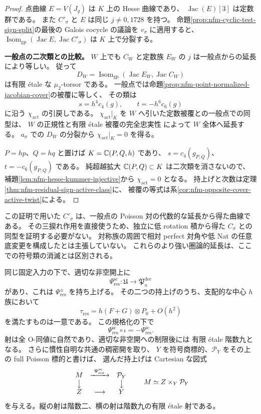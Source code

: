 \begin{proof}
点曲線 $E=V(J_g)$ は $K$ 上の Hesse 曲線であり、
$\operatorname{Jac}(E)[3]$ は定数群である。
また $C'_\sigma$ と $E$ は同じ $j\ne0,1728$ を持つ。
命題\ref{prop:nfm-cyclic-test-sign-split}の最後の Galois cocycle の議論を
$v_\sigma$ に適用すると、
$\operatorname{Isom}_{\mathrm{gp}}(\operatorname{Jac}E,\operatorname{Jac}C'_\sigma)$
は $K$ 上で分裂する。

\textbf{一般点の二次類との比較。}
$W$ 上でも $C_W$ と定数族 $E_W$ の $j$ は一般点からの延長により等しい。
従って
\[
 D_W=\operatorname{Isom}_{\mathrm{gp}}
       (\operatorname{Jac}E_W,\operatorname{Jac}C_W)
\]
は有限 \'etale な $\mu_2$-torsor である。
一般点では命題\ref{prop:nfm-point-normalized-jacobian-cover}の被覆に等しく、
その類は
\[
 s=h^4c_4(g),\qquad t=-h^6c_6(g)
\]
に沿う $\chi_{\mathrm{act}}$ の引戻しである。
$\chi_{\mathrm{act}}|_K$ を $W$ へ引いた定数被覆との一般点での同型は、
$W$ の正規性と有限 \'etale 被覆の完全忠実性
\cite[Lemma~58.10.7, Tag~0BQI]{NFMStacksEtaleNormal}によって $W$ 全体へ延長する。
$a_\sigma$ での $D_W$ の分裂から $\chi_{\mathrm{act}}|_K=0$ を得る。

$P=hp$、$Q=hq$ と置けば $K=\mathbb C(P,Q,h)$ であり、
$s=c_4(g_{P,Q})$、$t=-c_6(g_{P,Q})$ である。
純超越拡大 $\mathbb C(P,Q)\subset K$ は二次類を消さないので、
補題\ref{lem:nfm-hesse-kummer-injective}から $\chi_{\mathrm{act}}=0$ となる。
持上げと次数は定理\ref{thm:nfm-residual-sign-active-class}に、
被覆の等式は系\ref{cor:nfm-opposite-cover-active-twist}による。
\end{proof}

この証明で用いた $C'_\sigma$ は、一般点の Poisson 対の代数的な延長から得た曲線である。
その三捩れ作用を直接使うため、独立に低 rotation 積から得た
$C_\sigma$ との同型を証明する必要がない。
対称族の周囲で相対 perfect 対角や低 Nat の任意底変更を構成したとは主張していない。
これらのより強い圏論的延長は、ここでの符号類の消滅とは区別される。

\begin{corollary}
\label{cor:nfm-semiclassical-full-residual}
同じ固定入力の下で、適切な非空開上に
\[
 \Psi_{\mathrm{res}}^{\mathrm{sc}}:
     \mathfrak U\longrightarrow\mathfrak P_n^{\mathrm{dec}}
\]
があり、これは $\Psi_{\mathrm{res}}^\pm$ を持ち上げる。
その二つの持上げのうち、支配的な中心 $h$ 族において
\[
 \tau_{\mathrm{res}}
   =h(F+G)\otimes P_0+O(h^2)
\]
を満たすものは一意である。
この規格化の下で
\[
 \Psi_{\mathrm{res}}^{\mathrm{sc}}\circ\iota
     =-\Psi_{\mathrm{res}}^{\mathrm{sc}}.
\]
射は全 O-同値に自然であり、適切な非空開への制限後には
有限 \'etale 階数九となる。
さらに慣性自明な共通の稠密開を取り、
$Y$ を符号商標的、$\mathcal P_Y$ をその上の full Poisson 標的と書けば、
選んだ持上げは Cartesian な図式
\[
 \begin{array}{ccc}
 M&\xrightarrow{\ \Psi_{\mathrm{res}}^{\mathrm{sc}}\ }&\mathcal P_Y\\
 \big\downarrow&&\big\downarrow\\
 Z&\longrightarrow&Y
 \end{array}
 \qquad
 M\simeq Z\times_Y\mathcal P_Y
\]
を与える。縦の射は階数二、横の射は階数九の有限 \'etale 射である。
\end{corollary}

